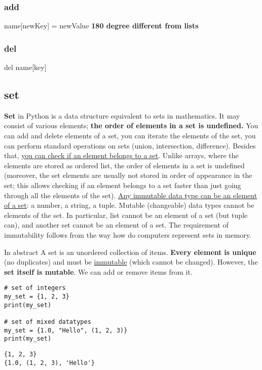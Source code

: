 \documentclass[11pt]{article}
\begin{document}
\subsubsection{add}
\label{sec:orgad560f9}
name[newKey] = newValue
\textbf{180 degree different from lists}

\subsubsection{del}
\label{sec:org0636ab5}
del name[key]

\subsection{set}
\label{sec:orgc3384ae}
\textbf{Set} in Python is a data structure equivalent to sets in
mathematics. It may consist of various elements; \textbf{the order of elements}
\textbf{in a set is undefined.} You can add and delete elements of a set, you
can iterate the elements of the set, you can perform standard
operations on sets (union, intersection, difference). Besides that,
\uline{you can check if an element belongs to a set}. Unlike arrays, where the
elements are stored as ordered list, the order of elements in a set is
undefined (moreover, the set elements are usually not stored in order
of appearance in the set; this allows checking if an element belongs
to a set faster than just going through all the elements of the
set). \uline{Any immutable data type can be an element of a set}: a number, a
string, a tuple. Mutable (changeable) data types cannot be elements of
the set. In particular, list cannot be an element of a set (but tuple
can), and another set cannot be an element of a set. The requirement
of immutability follows from the way how do computers represent sets
in memory.

In abstract A set is an unordered collection of items. \textbf{Every element}
\textbf{is unique} (no duplicates) and must be \uline{immutable} (which cannot be
changed). However, the \textbf{set itself is mutable}. We can add or remove
items from it.

\begin{verbatim}
# set of integers
my_set = {1, 2, 3}
print(my_set)

# set of mixed datatypes
my_set = {1.0, "Hello", (1, 2, 3)}
print(my_set)
\end{verbatim}

\begin{verbatim}
{1, 2, 3}
{1.0, (1, 2, 3), 'Hello'}
\end{verbatim}
\end{document}
